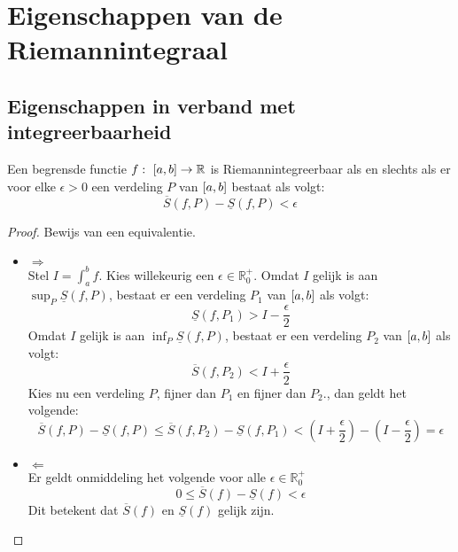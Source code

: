 \documentclass[main.tex]{subfiles}
\begin{document}
\section{Eigenschappen van de Riemannintegraal}
\label{sec:eigenschappen-van-de}

\subsection{Eigenschappen in verband met integreerbaarheid}
\label{sec:eigensch-verb-met}

\begin{bpr}
  Een begrensde functie $f:\ \interval{a}{b} \rightarrow \mathbb{R}$ is Riemannintegreerbaar als en slechts als er voor elke $\epsilon > 0$ een verdeling $P$ van $\interval{a}{b}$ bestaat als volgt:
  \[ \overline{S}(f,P) - \underline{S}(f,P) < \epsilon \]

  \begin{proof}
    Bewijs van een equivalentie.
    \begin{itemize}
    \item $\Rightarrow$\\
      Stel $I = \int_{a}^{b}f$.
      Kies willekeurig een $\epsilon\in\mathbb{R}_{0}^{+}$.
      Omdat $I$ gelijk is aan $\sup_{P}\underline{S}(f,P)$, bestaat er een verdeling $P_{1}$ van $\interval{a}{b}$ als volgt:
      \[ \underline{S}(f,P_{1}) > I-\frac{\epsilon}{2} \]
      Omdat $I$ gelijk is aan $\inf_{P}\underline{S}(f,P)$, bestaat er een verdeling $P_{2}$ van $\interval{a}{b}$ als volgt:
      \[ \overline{S}(f,P_{2}) < I+\frac{\epsilon}{2} \]
      Kies nu een verdeling $P$, fijner dan $P_{1}$ en fijner dan $P_{2}$., dan geldt het volgende:
      \[ \overline{S}(f,P) - \underline{S}(f,P) \le \overline{S}(f,P_{2}) - \underline{S}(f,P_{1}) < \left(I + \frac{\epsilon}{2}\right) - \left( I - \frac{\epsilon}{2} \right) = \epsilon \]
    \item $\Leftarrow$\\
      Er geldt onmiddeling het volgende voor alle $\epsilon\in\mathbb{R}_{0}^{+}$
      \[ 0 \le \overline{S}(f) - \underline{S}(f) < \epsilon \]
      Dit betekent dat $\overline{S}(f)$ en $\underline{S}(f)$ gelijk zijn.
    \end{itemize}
  \end{proof}
\end{bpr}
\end{document}
